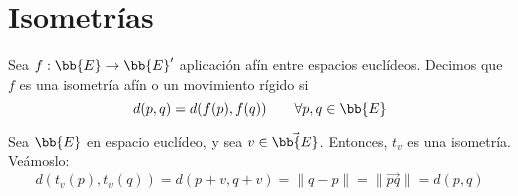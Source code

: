 \section{Isometrías}
\begin{definicion}[Isometrías]
    Sea $f:\bb{E}\to \bb{E}'$ aplicación afín entre espacios euclídeos. Decimos que $f$ es una isometría afín o un movimiento rígido si 
    $$d(p,q)=d(f(p),f(q))\qquad \forall p,q\in \bb{E}$$
\end{definicion}
\begin{ejemplo}
    Sea $\bb{E}$ en espacio euclídeo, y sea $v\in \vec{\bb{E}}$. Entonces, $t_v$ es una isometría. Veámoslo:
    \begin{equation*}
        d(t_v(p), t_v(q))=d(p+v, q+v)=\|q-p\|=\|\vec{pq}\|=d(p,q)
    \end{equation*}
\end{ejemplo}

